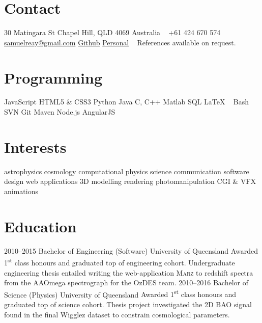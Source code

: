 \documentclass[]{friggeri-cv} %
\begin{document}


\begin{aside} %
\section{Contact}
30 Matingara St
Chapel Hill, QLD 4069
Australia
~
+61 424 670 574
~
\href{mailto:samuelreay@gmail.com}{samuelreay@gmail.com}
\href{https://github.com/samreay}{Github}
\href{https://Samreay.github.io}{Personal}
~
References available on request.
~
\section{Programming}
JavaScript
HTML5 \& CSS3
Python
Java 
C, C++
Matlab
SQL 
LaTeX
~
Bash
SVN
Git
Maven
Node.js
AngularJS
~
\section{Interests}
astrophysics
cosmology 
 computational physics 
  science communication 
   software design 
    web applications 
     3D modelling 
      rendering 
       photomanipulation 
        CGI \& VFX
        animations
\end{aside}



\section{Education}

\begin{entrylist}
\entry
{2010--2015}
{Bachelor of Engineering {\normalfont (Software)}}
{University of Queensland}
{Awarded 1\textsuperscript{st} class honours and graduated top of engineering cohort. Undergraduate engineering thesis entailed writing the web-application \textsc{Marz} to redshift spectra from the AAOmega spectrograph for the OzDES team. }
\entry
{2010--2016}
{Bachelor of Science {\normalfont (Physics)}}
{University of Queensland}
{Awarded 1\textsuperscript{st} class honours and graduated top of science cohort. Thesis project investigated the 2D BAO signal found in the final Wigglez dataset to constrain cosmological parameters.}
\end{entrylist}
\end{document}
